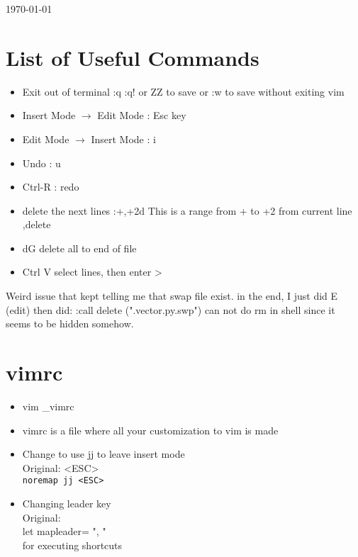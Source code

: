 \documentclass[12 pt , twoside, letterpaper] {article}
\begin{document}
\today
\section{List of Useful Commands}
\begin {itemize}
\item Exit out of terminal 
:q
:q!
or ZZ to save 
or :w to save without exiting vim
\item Insert Mode $\rightarrow$ Edit Mode : Esc key
\item Edit Mode $\rightarrow$ Insert Mode :
i
\item Undo : u
\item Ctrl-R : redo
\item delete the next  lines
:+,+2d
This is a range 
from + to +2 from current line ,delete
\item dG delete all to end of file
\item Ctrl V select lines, then enter >
\end {itemize}
Weird issue that kept telling me that swap file exist. 
in the end, I just did E (edit) then did:
:call delete (".vector.py.swp")
can not do rm in shell since it seems to be hidden somehow.

\section{vimrc}
\begin{itemize}
\item vim \_vimrc
\item vimrc is a file where all your customization to vim is made
\item Change to use jj to leave insert mode 
\\Original: <ESC> 
\\ \verb !noremap jj <ESC>!
\item Changing leader key
\\Original: \
\\ let mapleader= ", "
\\for executing shortcuts
\end{itemize}
\end{document}
